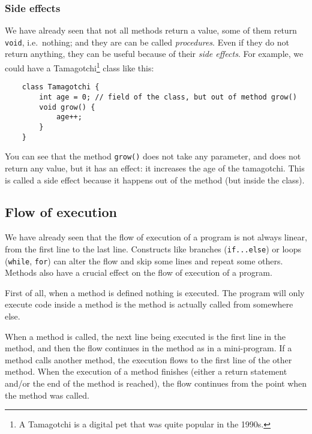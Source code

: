 \subsubsection*{Side effects}
\label{sec:side-effects}

We have already seen that not all methods return a value, some of them
return \verb+void+, i.e.~nothing; and they are can be called
\emph{procedures}. Even if they do not return anything, they can be useful
because of their \emph{side effects}. For example, we could have a
Tamagotchi\footnote{A Tamagotchi is a digital pet that was quite
  popular in the 1990s.} class like this: 

\begin{verbatim}
    class Tamagotchi {
        int age = 0; // field of the class, but out of method grow()
        void grow() {
            age++;
        }
    }
\end{verbatim}

You can see that the method \verb+grow()+ does not take any parameter,
and does not return any value, but it has an effect: it increases the
age of the tamagotchi. This is called a side effect because it happens
out of the method (but inside the class). 

\subsection{Flow of execution}
\label{sec:flow-execution}

We have already seen that the flow of execution of a program is not
always linear, from the first line to the last line. Constructs like
branches (\verb+if...else+) or loops (\verb+while+, \verb+for+) can
alter the flow and skip some lines and repeat some others. Methods
also have a crucial effect on the flow of execution of a program. 

First of all, when a method is defined nothing is executed. The
program will only execute code inside a method is the method is
actually called from somewhere else. 

When a method is called, the next line being executed is the first
line in the method, and then the flow continues in the method as in a
mini-program. If a method calls another method, the execution flows to
the first line of the other method. When the execution of a method
finishes (either a return statement and/or the end of the method is
reached), the flow continues from the point when the method was
called. 



